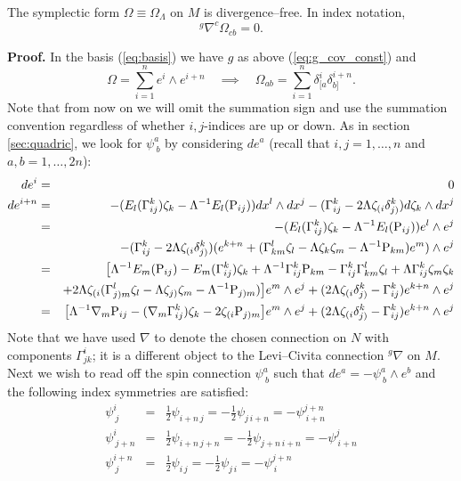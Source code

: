 \begin{lemma} \label{lem:div_free} The symplectic form $\Omega\equiv\Omega_\Lambda$ on $M$ is divergence--free. In index notation,
\[
{^g\nabla}^c\Omega_{cb}=0.
\]
\end{lemma}

{\bf Proof.} In the basis
(\ref{eq:basis}) we have $g$ as above (\ref{eq:g_cov_const})
and
\[
\Omega=\sum_{i=1}^{n}e^{i}\wedge e^{i+n}\quad\implies\quad\Omega_{ab}=\sum_{i=1}^{n}\delta_{[a}^{i}\delta_{b]}^{i+n}.
\]
Note that from now on we will omit the summation sign and use the
summation convention regardless of whether $i,j$-indices are up or
down. As in section \ref{sec:quadric}, we look for $\psi_{\ b}^{a}$
by considering $ de^{a}$ (recall that $i,j=1,\dots,n$ and
$a,b=1,\dots,2n$):
\begin{eqnarray*}
 de^{i} & = & 0\\
 de^{i+n} & = & -(E_{l}(\Gamma_{ij}^{k})\zeta_{k}-\Lambda^{-1}E_{l}(\mathrm{P}_{ij})) dx^{l}\wedge dx^{j}-(\Gamma_{ij}^{k}-2\Lambda \zeta_{(i}\delta_{j)}^{k}) d\zeta_{k}\wedge dx^{j}\\
 & = & -(E_{l}(\Gamma_{ij}^{k})\zeta_{k}-\Lambda^{-1}E_{l}(\mathrm{P}_{ij}))e^{l}\wedge e^{j}\\
 &  & -(\Gamma_{ij}^{k}-2\Lambda \zeta_{(i}\delta_{j)}^{k})(e^{k+n}+(\Gamma_{km}^{l}\zeta_{l}-\Lambda \zeta_{k}\zeta_{m}-\Lambda^{-1}\mathrm{P}_{km})e^{m})\wedge e^{j}\\
 & = & \bigl[\Lambda^{-1}E_{m}(\mathrm{P}_{ij})-E_{m}(\Gamma_{ij}^{k})\zeta_{k}+\Lambda^{-1}\Gamma_{ij}^{k}\mathrm{P}_{km}-\Gamma_{ij}^{k}\Gamma_{km}^{l}\zeta_{l}+\Lambda\Gamma_{ij}^{k}\zeta_{m}\zeta_{k}\\
 &  & +2\Lambda \zeta_{(i}(\Gamma_{j)m}^{l}\zeta_{l}-\Lambda \zeta_{j)}\zeta_{m}-\Lambda^{-1}\mathrm{P}_{j)m})\bigr]e^{m}\wedge e^{j}+(2\Lambda \zeta_{(i}\delta_{j)}^{k}-\Gamma_{ij}^{k})e^{k+n}\wedge e^{j}\\
 & = & \bigl[\Lambda^{-1}{\nabla}_{m}\mathrm{P}_{ij}-({\nabla}_{m}\Gamma_{ij}^{k})\zeta_{k}-2\zeta_{(i}\mathrm{P}_{j)m}\bigr]e^{m}\wedge e^{j}+(2\Lambda \zeta_{(i}\delta_{j)}^{k}-\Gamma_{ij}^{k})e^{k+n}\wedge e^{j}\\
\end{eqnarray*}
Note that we have used ${\nabla}$ to denote the chosen connection on $N$
with components $\Gamma_{jk}^{i}$; it is a different object to the Levi--Civita connection $^g\nabla$ on $M$. Next we wish to read off the spin
connection $\psi_{\ b}^{a}$ such that ${d}e^{a}=-\psi_{\ b}^{a}\wedge e^{b}$
and the following index symmetries are satisfied:
\begin{eqnarray*}
\psi_{\ j}^{i} & = & \frac{1}{2}\psi_{i+n\, j}=-\frac{1}{2}\psi_{j\, i+n}=-\psi_{\ i+n}^{j+n}\\
\psi_{\ j+n}^{i} & = & \frac{1}{2}\psi_{i+n\, j+n}=-\frac{1}{2}\psi_{j+n\, i+n}=-\psi_{\ i+n}^{j}\\
\psi_{\ j}^{i+n} & = & \frac{1}{2}\psi_{i\, j}=-\frac{1}{2}\psi_{j\, i}=-\psi_{\ i}^{j+n}
\end{eqnarray*}
